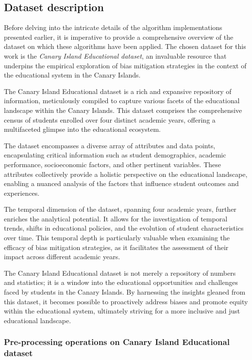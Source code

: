 \documentclass[12pt,a4paper,openright,twoside]{book}
\begin{document}
\subsection{Dataset description}

Before delving into the intricate details of the algorithm implementations presented earlier, it is imperative to provide a comprehensive overview of the dataset on which these algorithms have been applied. The chosen dataset for this work is the \emph{Canary Island Educational dataset}, an invaluable resource that underpins the empirical exploration of bias mitigation strategies in the context of the educational system in the Canary Islands. 

The Canary Island Educational dataset is a rich and expansive repository of information, meticulously compiled to capture various facets of the educational landscape within the Canary Islands. This dataset comprises the comprehensive census of students enrolled over four distinct academic years, offering a multifaceted glimpse into the educational ecosystem. 

The dataset encompasses a diverse array of attributes and data points, encapsulating critical information such as student demographics, academic performance, socioeconomic factors, and other pertinent variables. These attributes collectively provide a holistic perspective on the educational landscape, enabling a nuanced analysis of the factors that influence student outcomes and experiences. 

The temporal dimension of the dataset, spanning four academic years, further enriches the analytical potential. It allows for the investigation of temporal trends, shifts in educational policies, and the evolution of student characteristics over time. This temporal depth is particularly valuable when examining the efficacy of bias mitigation strategies, as it facilitates the assessment of their impact across different academic years. 

The Canary Island Educational dataset is not merely a repository of numbers and statistics; it is a window into the educational opportunities and challenges faced by students in the Canary Islands. By harnessing the insights gleaned from this dataset, it becomes possible to proactively address biases and promote equity within the educational system, ultimately striving for a more inclusive and just educational landscape.

\subsubsection{Pre-processing operations on Canary Island Educational dataset}
\end{document}
